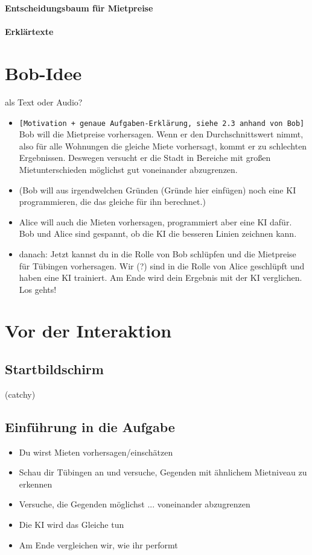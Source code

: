 \documentclass[12pt]{article}
\begin{document}
\textbf{Entscheidungsbaum für Mietpreise}\\
\\
\textbf{\Huge Erklärtexte}

\tableofcontents

\newpage

\section{Bob-Idee}

als Text oder Audio?

\begin{itemize}
    \item \texttt{[Motivation + genaue Aufgaben-Erklärung, siehe 2.3 anhand von Bob]} Bob will die Mietpreise vorhersagen. Wenn er den Durchschnittswert nimmt, also für alle Wohnungen die gleiche Miete vorhersagt, kommt er zu schlechten Ergebnissen. Deswegen versucht er die Stadt in Bereiche mit großen Mietunterschieden möglichst gut voneinander abzugrenzen. 
    \item (Bob will aus irgendwelchen Gründen (Gründe hier einfügen) noch eine KI programmieren, die das gleiche für ihn berechnet.)
    \item Alice will auch die Mieten vorhersagen, programmiert aber eine KI dafür. Bob und Alice sind gespannt, ob die KI die besseren Linien zeichnen kann. 
    \item danach: Jetzt kannst du in die Rolle von Bob schlüpfen und die Mietpreise für Tübingen vorhersagen. Wir (?) sind in die Rolle von Alice geschlüpft und haben eine KI trainiert. Am Ende wird dein Ergebnis mit der KI verglichen. Los gehts!
\end{itemize}

\section{Vor der Interaktion}

\subsection{Startbildschirm}
(catchy)

\subsection{Einführung in die Aufgabe}
\begin{itemize}
    \item Du wirst Mieten vorhersagen/einschätzen
    \item Schau dir Tübingen an und versuche, Gegenden mit ähnlichem Mietniveau zu erkennen
    \item Versuche, die Gegenden möglichst ... voneinander abzugrenzen
    \item Die KI wird das Gleiche tun
    \item Am Ende vergleichen wir, wie ihr performt
\end{itemize}
\end{document}
